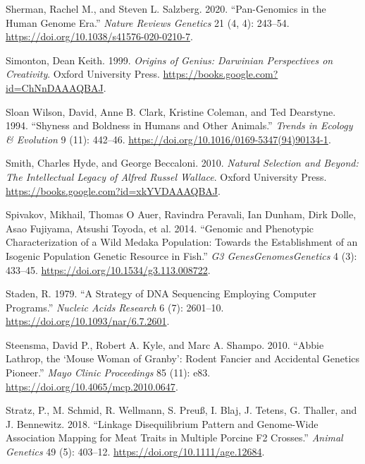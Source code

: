 \documentclass[
]{book}
\newlength{\cslhangindent}
\newlength{\cslentryspacingunit} %
\newenvironment{CSLReferences}[2] %
 {%
  \setlength{\parindent}{0pt}
  \ifodd #1
  \let\oldpar\par
  \def\par{\hangindent=\cslhangindent\oldpar}
  \fi
  \setlength{\parskip}{#2\cslentryspacingunit}
 }%
 {}
\begin{document}
\begin{CSLReferences}{1}{0}
\leavevmode{}%
Sherman, Rachel M., and Steven L. Salzberg. 2020. {``Pan-Genomics in the Human Genome Era.''} \emph{Nature Reviews Genetics} 21 (4, 4): 243--54. \url{https://doi.org/10.1038/s41576-020-0210-7}.

\leavevmode{}%
Simonton, Dean Keith. 1999. \emph{Origins of {Genius}: {Darwinian Perspectives} on {Creativity}}. {Oxford University Press}. \url{https://books.google.com?id=ChNnDAAAQBAJ}.

\leavevmode{}%
Sloan Wilson, David, Anne B. Clark, Kristine Coleman, and Ted Dearstyne. 1994. {``Shyness and Boldness in Humans and Other Animals.''} \emph{Trends in Ecology \& Evolution} 9 (11): 442--46. \url{https://doi.org/10.1016/0169-5347(94)90134-1}.

\leavevmode{}%
Smith, Charles Hyde, and George Beccaloni. 2010. \emph{Natural {Selection} and {Beyond}: {The Intellectual Legacy} of {Alfred Russel Wallace}}. {Oxford University Press}. \url{https://books.google.com?id=xkYVDAAAQBAJ}.

\leavevmode{}%
Spivakov, Mikhail, Thomas O Auer, Ravindra Peravali, Ian Dunham, Dirk Dolle, Asao Fujiyama, Atsushi Toyoda, et al. 2014. {``Genomic and {Phenotypic Characterization} of a {Wild Medaka Population}: {Towards} the {Establishment} of an {Isogenic Population Genetic Resource} in {Fish}.''} \emph{G3 Genes\textbar Genomes\textbar Genetics} 4 (3): 433--45. \url{https://doi.org/10.1534/g3.113.008722}.

\leavevmode{}%
Staden, R. 1979. {``A Strategy of {DNA} Sequencing Employing Computer Programs.''} \emph{Nucleic Acids Research} 6 (7): 2601--10. \url{https://doi.org/10.1093/nar/6.7.2601}.

\leavevmode{}%
Steensma, David P., Robert A. Kyle, and Marc A. Shampo. 2010. {``Abbie {Lathrop}, the {`{Mouse Woman} of {Granby}'}: {Rodent Fancier} and {Accidental Genetics Pioneer}.''} \emph{Mayo Clinic Proceedings} 85 (11): e83. \url{https://doi.org/10.4065/mcp.2010.0647}.

\leavevmode{}%
Stratz, P., M. Schmid, R. Wellmann, S. Preuß, I. Blaj, J. Tetens, G. Thaller, and J. Bennewitz. 2018. {``Linkage Disequilibrium Pattern and Genome-Wide Association Mapping for Meat Traits in Multiple Porcine {F2} Crosses.''} \emph{Animal Genetics} 49 (5): 403--12. \url{https://doi.org/10.1111/age.12684}.


\end{CSLReferences}
\end{document}
